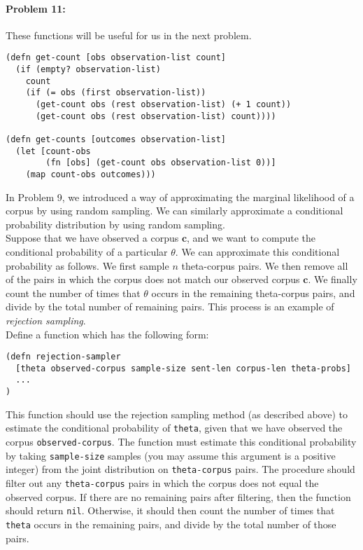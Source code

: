 \documentclass[10pt]{article}
\newcommand{\required}[1]{{\color{blue}{#1}}}
\begin{document}
\noindent\hrulefill %

\paragraph{Problem 11:}
These functions will be useful for us in the next problem.

\begin{lstlisting}
(defn get-count [obs observation-list count]
  (if (empty? observation-list)
    count
    (if (= obs (first observation-list))
      (get-count obs (rest observation-list) (+ 1 count))
      (get-count obs (rest observation-list) count))))

(defn get-counts [outcomes observation-list]
  (let [count-obs 
        (fn [obs] (get-count obs observation-list 0))]
    (map count-obs outcomes)))
\end{lstlisting}

\noindent In Problem 9, we introduced a way of approximating the
marginal likelihood of a corpus by using random sampling. We can
similarly approximate a conditional probability distribution by using
random sampling.  \\

\noindent Suppose that we have observed a corpus $\mathbf{c}$, and we
want to compute the conditional probability of a particular $\theta$.
We can approximate this conditional probability as follows. We first
sample $n$ theta-corpus pairs. We then remove all of the pairs in
which the corpus does not match our observed corpus $\mathbf{c}$. We
finally count the number of times that $\theta$ occurs in the
remaining theta-corpus pairs, and divide by the total number of
remaining pairs. This process is an example of \textit{rejection sampling}.
\\

\noindent Define a function \required{\texttt{rejection-sampler}}
which has the following form:
 
\begin{lstlisting}
(defn rejection-sampler
  [theta observed-corpus sample-size sent-len corpus-len theta-probs]
  ...
)
\end{lstlisting}

\noindent This function should use the rejection sampling method (as
described above) to estimate the conditional probability of
\texttt{theta}, given that we have observed the corpus
\texttt{observed-corpus}. The function must estimate this conditional
probability by taking \texttt{sample-size} samples (you may assume
this argument is a positive integer) from the joint distribution on
\texttt{theta-corpus} pairs. The procedure should filter out any
\texttt{theta-corpus} pairs in which the corpus does not equal the
observed corpus. If there are no remaining pairs after filtering, then 
the function should return \texttt{nil}. Otherwise,
it should then count the number of times that \texttt{theta} occurs in the remaining pairs,
and divide by the total number of those pairs.
\end{document}
